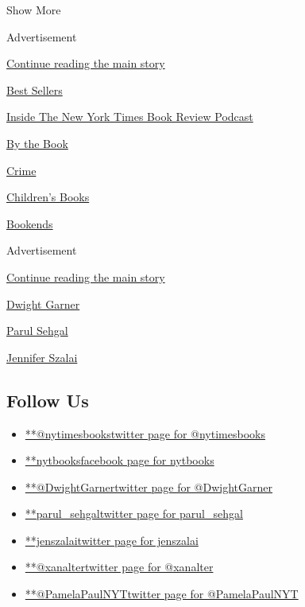 Show More

Advertisement

\protect\hyperlink{after-mid2}{Continue reading the main story}

\href{https://www.nytimes.com/best-sellers-books/overview.html}{Best
Sellers}

\href{https://www.nytimes.com/column/book-review-podcast}{Inside The New
York Times Book Review Podcast}

\href{https://www.nytimes.com/column/by-the-book}{By the Book}

\href{https://www.nytimes.com/column/crime}{Crime}

\href{https://www.nytimes.com/column/childrens-books}{Children's Books}

\href{https://www.nytimes.com/column/bookends}{Bookends}

Advertisement

\protect\hyperlink{after-mktg}{Continue reading the main story}

\href{https://www.nytimes.com/by/dwight-garner}{Dwight Garner}

\href{https://www.nytimes.com/by/parul-sehgal}{Parul Sehgal}

\href{https://www.nytimes.com/by/jennifer-szalai}{Jennifer Szalai}

\hypertarget{follow-us}{%
\subsection{Follow Us}\label{follow-us}}

\begin{itemize}
\tightlist
\item
  \href{https://twitter.com/nytimesbooks}{**@nytimesbookstwitter page
  for @nytimesbooks}
\item
  \href{https://www.facebook.com/nytbooks}{**nytbooksfacebook page for
  nytbooks}
\item
  \href{https://twitter.com/DwightGarner}{**@DwightGarnertwitter page
  for @DwightGarner}
\item
  \href{https://twitter.com/parul_sehgal}{**parul\_sehgaltwitter page
  for parul\_sehgal}
\item
  \href{https://twitter.com/jenszalai}{**jenszalaitwitter page for
  jenszalai}
\item
  \href{https://twitter.com/xanalter}{**@xanaltertwitter page for
  @xanalter}
\item
  \href{https://twitter.com/PamelaPaulNYT}{**@PamelaPaulNYTtwitter page
  for @PamelaPaulNYT}
\end{itemize}

